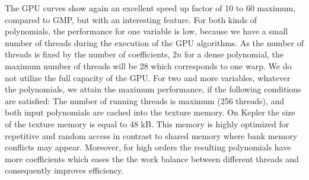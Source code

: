 \documentclass[oribibl]{llncs2e/llncs}
\begin{document}
The GPU curves show again an excellent speed up  factor of 10 to 60 maximum, compared to GMP, but with an interesting feature. 
For both kinds of polynomials, the performance for one variable is low, because we have a small number of threads during the execution of the GPU algorithms.
As the number of threads is fixed by the number of coefficients, $2n$ for a dense polynomial,  the maximum number of threads will be 28
 which corresponds to one warp. We do not utilize the full capacity of the GPU. For two and more variables, whatever the polynomials, 
  we attain the maximum performance,  if the following conditions are satisfied: The number of running threads is maximum (256 threads), and both input
  polynomials  are cached into the texture memory. On Kepler the size of the texture memory is equal to 48 kB. This memory  is highly optimized for repetitive and random access in contrast to shared memory
 where bank memory conflicts may appear. Moreover, for high orders the resulting polynomials have more coefficients which eases the the work balance between different threads and consequently improves efficiency.
 
\end{document}
